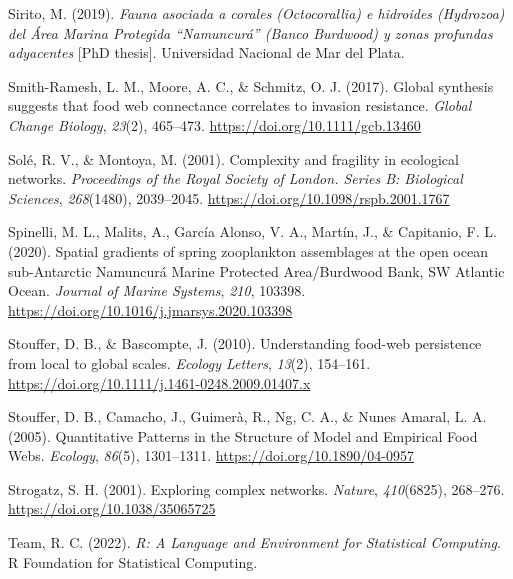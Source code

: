 \documentclass[preprint, 3p,
authoryear]{elsarticle} %
\newlength{\cslhangindent}
\newlength{\cslentryspacingunit} %
\newenvironment{CSLReferences}[2] %
 {%
  \setlength{\parindent}{0pt}
  \ifodd #1
  \let\oldpar\par
  \def\par{\hangindent=\cslhangindent\oldpar}
  \fi
  \setlength{\parskip}{#2\cslentryspacingunit}
 }%
 {}
\begin{document}
\begin{CSLReferences}{1}{0}
\leavevmode{}%
Sirito, M. (2019). \emph{Fauna asociada a corales ({Octocorallia}) e
hidroides ({Hydrozoa}) del {Área Marina Protegida} {``{Namuncurá}''}
({Banco Burdwood}) y zonas profundas adyacentes} {[}PhD thesis{]}.
Universidad Nacional de Mar del Plata.

\leavevmode{}%
Smith-Ramesh, L. M., Moore, A. C., \& Schmitz, O. J. (2017). Global
synthesis suggests that food web connectance correlates to invasion
resistance. \emph{Global Change Biology}, \emph{23}(2), 465--473.
\url{https://doi.org/10.1111/gcb.13460}

\leavevmode{}%
Solé, R. V., \& Montoya, M. (2001). Complexity and fragility in
ecological networks. \emph{Proceedings of the Royal Society of London.
Series B: Biological Sciences}, \emph{268}(1480), 2039--2045.
\url{https://doi.org/10.1098/rspb.2001.1767}

\leavevmode{}%
Spinelli, M. L., Malits, A., García Alonso, V. A., Martín, J., \&
Capitanio, F. L. (2020). Spatial gradients of spring zooplankton
assemblages at the open ocean sub-{Antarctic Namuncurá Marine Protected
Area}/{Burdwood Bank}, {SW Atlantic Ocean}. \emph{Journal of Marine
Systems}, \emph{210}, 103398.
\url{https://doi.org/10.1016/j.jmarsys.2020.103398}

\leavevmode{}%
Stouffer, D. B., \& Bascompte, J. (2010). Understanding food-web
persistence from local to global scales. \emph{Ecology Letters},
\emph{13}(2), 154--161.
\url{https://doi.org/10.1111/j.1461-0248.2009.01407.x}

\leavevmode{}%
Stouffer, D. B., Camacho, J., Guimerà, R., Ng, C. A., \& Nunes Amaral,
L. A. (2005). Quantitative {Patterns} in the {Structure} of {Model} and
{Empirical Food Webs}. \emph{Ecology}, \emph{86}(5), 1301--1311.
\url{https://doi.org/10.1890/04-0957}

\leavevmode{}%
Strogatz, S. H. (2001). Exploring complex networks. \emph{Nature},
\emph{410}(6825), 268--276. \url{https://doi.org/10.1038/35065725}

\leavevmode{}%
Team, R. C. (2022). \emph{R: {A Language} and {Environment} for
{Statistical Computing}}. R Foundation for Statistical Computing.


\end{CSLReferences}
\end{document}
